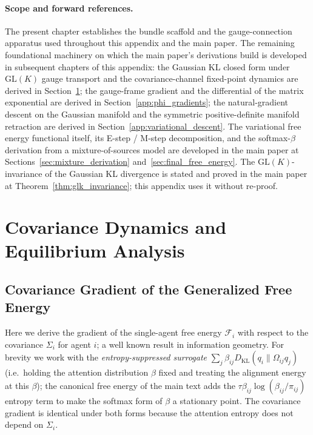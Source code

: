 \documentclass[twoside,11pt]{article}
\begin{document}
\paragraph{Scope and forward references.} The present chapter establishes the bundle scaffold and the gauge-connection apparatus used throughout this appendix and the main paper. The remaining foundational machinery on which the main paper's derivations build is developed in subsequent chapters of this appendix: the Gaussian KL closed form under $\mathrm{GL}(K)$ gauge transport and the covariance-channel fixed-point dynamics are derived in Section~\ref{app:covariance_dynamics}; the gauge-frame gradient and the differential of the matrix exponential are derived in Section~\ref{app:phi_gradients}; the natural-gradient descent on the Gaussian manifold and the symmetric positive-definite manifold retraction are derived in Section~\ref{app:variational_descent}. The variational free energy functional itself, its E-step / M-step decomposition, and the softmax-$\beta$ derivation from a mixture-of-sources model are developed in the main paper at Sections~\ref{sec:mixture_derivation} and~\ref{sec:final_free_energy}. The $\mathrm{GL}(K)$-invariance of the Gaussian KL divergence is stated and proved in the main paper at Theorem~\ref{thm:glk_invariance}; this appendix uses it without re-proof.



\section{Covariance Dynamics and Equilibrium Analysis}
\label{app:covariance_dynamics}

\subsection{Covariance Gradient of the Generalized Free Energy}

Here we derive the gradient of the single-agent free energy $\mathcal{F}_i$ with respect to the covariance $\Sigma_i$ for agent $i$; a well known result in information geometry. For brevity we work with the \emph{entropy-suppressed surrogate} $\sum_j \beta_{ij} D_{\mathrm{KL}}(q_i \| \Omega_{ij}q_j)$ (i.e.\ holding the attention distribution $\beta$ fixed and treating the alignment energy at this $\beta$); the canonical free energy of the main text adds the $\tau\beta_{ij}\log(\beta_{ij}/\pi_{ij})$ entropy term to make the softmax form of $\beta$ a stationary point. The covariance gradient is identical under both forms because the attention entropy does not depend on $\Sigma_i$.
\end{document}
